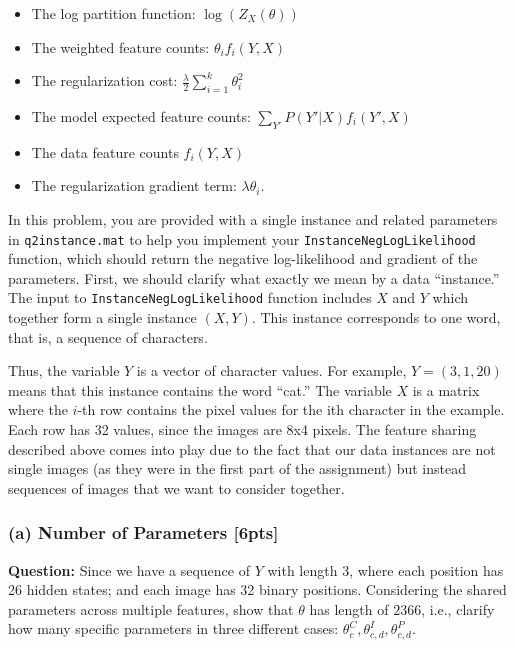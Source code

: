 \begin{itemize}
\item The log partition function: $\log ( Z_X (\theta) )$

\item The weighted feature counts: $\theta_i f_i ( Y, X )$

\item The regularization cost: $ \frac{\lambda}{2} \sum_{i=1}^k \theta_i^2$

\item The model expected feature counts: $\sum_{Y'}  P(Y' | X) f_i (Y', X) $

\item The data feature counts $f_i (Y, X)$

\item The regularization gradient term: $\lambda \theta_i$.

\end{itemize}

In this problem, you are provided with a single instance and related parameters in \verb|q2instance.mat| to help you implement your \verb|InstanceNegLogLikelihood| function, which should return the negative log-likelihood and gradient of the parameters. First, we should clarify what exactly we mean by a data “instance.” The input to \verb|InstanceNegLogLikelihood| function includes $X$ and $Y$ which together form a single instance $(X,Y)$. This instance corresponds to one
word, that is, a sequence of characters.

Thus, the variable $Y$ is a vector of character values. For example, $Y = (3, 1, 20)$ means that this instance contains the word “cat.” The variable $X$ is a matrix where the $i$-th row contains the pixel values for the ith character in the example. Each row has 32 values, since the images are 8x4 pixels. The feature sharing described above comes into play due to the fact that our data instances are not single images (as they were in the first part of the assignment) but instead sequences of images that we want to consider together.


\subsubsection*{(a) Number of Parameters [6pts] }

\textbf{Question:} Since we have a sequence of $Y$ with length 3, where each position has 26 hidden states; and each image has 32 binary positions. Considering the shared parameters across multiple features, show that $\theta$ has length of $2366$, i.e., clarify how many specific parameters in three different cases: $\theta_c^C, \theta_{c,d}^I, \theta_{c,d}^P$.

